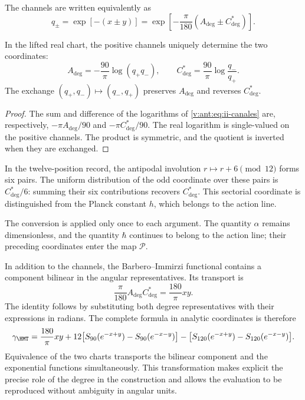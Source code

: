 The channels are written equivalently as
\begin{equation}
 q_\pm=\exp[-(x\pm y)]
 =\exp\!\left[-\frac{\pi}{180}(A_{\deg}\pm C^*_{\deg})\right].
\label{v:ant:eq:ii-canales}
\end{equation}
\begin{proposition}
\label{v:ant:prop:ii-inversion-canales-angulares}
In the lifted real chart, the positive channels uniquely
determine the two coordinates:
\[
 A_{\deg}=-\frac{90}{\pi}\log(q_+q_-),\qquad
 C^*_{\deg}=\frac{90}{\pi}\log\frac{q_-}{q_+}.
\]
The exchange \((q_+,q_-)\mapsto(q_-,q_+)\) preserves
\(A_{\deg}\) and reverses \(C^*_{\deg}\).
\end{proposition}
\begin{proof}
The sum and difference of the logarithms of
\eqref{v:ant:eq:ii-canales} are, respectively,
\(-\pi A_{\deg}/90\) and \(-\pi C^*_{\deg}/90\).
The real logarithm is single-valued on the positive channels.
The product is symmetric, and the quotient is inverted when they are exchanged.
\end{proof}
In the twelve-position record, the antipodal involution
\(r\mapsto r+6\pmod {12}\) forms six pairs. The uniform
distribution of the odd coordinate over these pairs is
\(C^*_{\deg}/6\): summing their six contributions recovers
\(C^*_{\deg}\). This sectorial coordinate is distinguished from
the Planck constant \(h\), which belongs to the action line.

The conversion is applied only once to each argument. The quantity
\(\alpha\) remains dimensionless, and the quantity \(\hbar\)
continues to belong to the action line; their preceding coordinates
enter the map \(\mathcal P\).

In addition to the channels, the Barbero--Immirzi functional contains a
component bilinear in the angular representatives. Its transport is
\begin{equation}
 \frac{\pi}{180}A_{\deg}C^*_{\deg}
 =\frac{180}{\pi}xy.
 \label{v:ant:eq:ii-barbero-cartas}
\end{equation}
The identity follows by substituting both degree representatives
with their expressions in radians. The complete formula in analytic
coordinates is therefore
\[
 \gamma_{\HMT}
 =\frac{180}{\pi}xy
 +12\bigl[S_{90}(e^{-x+y})-S_{90}(e^{-x-y})\bigr]
 -\bigl[S_{120}(e^{-x+y})-S_{120}(e^{-x-y})\bigr].
\]
Equivalence of the two charts transports the bilinear component
and the exponential functions simultaneously. This transformation
makes explicit the precise role of the degree in the construction and allows
the evaluation to be reproduced without ambiguity in angular units.
